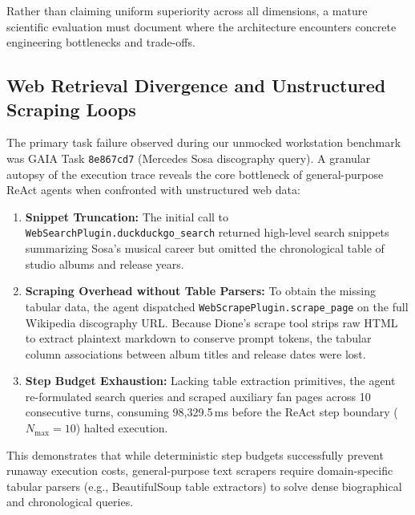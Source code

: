 \documentclass[conference,a4paper]{IEEEtran}
\begin{document}
Rather than claiming uniform superiority across all dimensions, a mature scientific evaluation must document where the architecture encounters concrete engineering bottlenecks and trade-offs.

\subsection{Web Retrieval Divergence and Unstructured Scraping Loops}
The primary task failure observed during our unmocked workstation benchmark was GAIA Task \texttt{8e867cd7} (Mercedes Sosa discography query). A granular autopsy of the execution trace reveals the core bottleneck of general-purpose ReAct agents when confronted with unstructured web data:
\begin{enumerate}
    \item \textbf{Snippet Truncation:} The initial call to \texttt{WebSearchPlugin.duckduckgo\_search} returned high-level search snippets summarizing Sosa's musical career but omitted the chronological table of studio albums and release years.
    \item \textbf{Scraping Overhead without Table Parsers:} To obtain the missing tabular data, the agent dispatched \texttt{WebScrapePlugin.scrape\_page} on the full Wikipedia discography URL. Because Dione's scrape tool strips raw HTML to extract plaintext markdown to conserve prompt tokens, the tabular column associations between album titles and release dates were lost.
    \item \textbf{Step Budget Exhaustion:} Lacking table extraction primitives, the agent re-formulated search queries and scraped auxiliary fan pages across 10 consecutive turns, consuming 98,329.5\,ms before the ReAct step boundary ($N_{\text{max}} = 10$) halted execution.
\end{enumerate}
This demonstrates that while deterministic step budgets successfully prevent runaway execution costs, general-purpose text scrapers require domain-specific tabular parsers (e.g., BeautifulSoup table extractors) to solve dense biographical and chronological queries.
\end{document}
